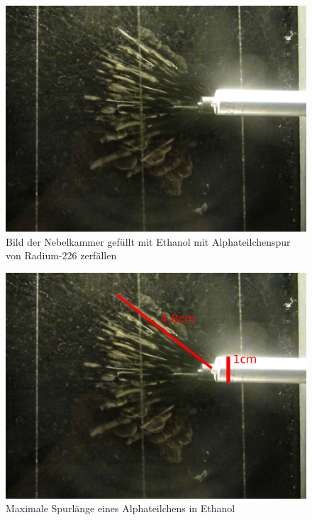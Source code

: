 \documentclass[12pt,a4paper]{article}
\begin{document}
\begin{multicols}{2}
\begin{figure}[H]
	\centering
	\includegraphics[scale=0.055]{./figures/alpha_auswertung.JPG}
	\caption{Bild der Nebelkammer gefüllt mit Ethanol mit Alphateilchenspur von Radium-226 zerfällen}
	\label{fig:roh_nebel_erg}
\end{figure}

\begin{figure}[H]
	\centering
	\includegraphics[scale=0.13]{./figures/radium226_ethanol_nebelspur.jpg}
	\caption{Maximale Spurlänge eines Alphateilchens in Ethanol}
	\label{fig:ausw_nebel_erg}
\end{figure}

\pagebreak

\end{multicols}
\end{document}
